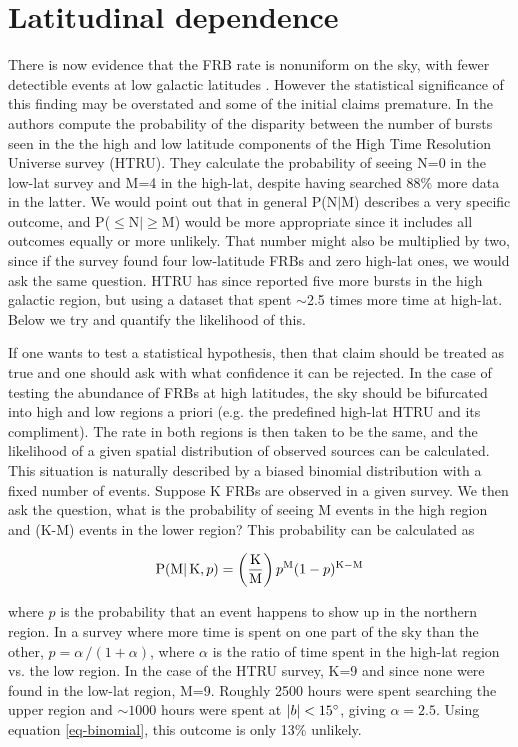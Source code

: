 \documentclass[useAMS,usenatbib]{mn2e}
\begin{document}
\section{Latitudinal dependence}
\label{latitude}
There is now evidence that the FRB rate is nonuniform on the sky, 
with fewer detectible events at low galactic latitudes \citep{2014ira..book.....B}.
However the statistical significance of this finding may be 
overstated and some of the initial claims premature. In \cite{2014ApJ...789L..26P}
the authors compute the probability of the disparity between the number of 
bursts seen in the the high and low latitude components of the High Time Resolution Universe survey 
(HTRU). They calculate the probability of seeing N=0 in the low-lat survey and M=4 in 
the high-lat, despite having searched 88$\%$ more data in the latter. We would point out 
that in general P(N$|$M) describes a very specific outcome, and P($\le$N$|\ge$M) would be 
more appropriate since it includes all outcomes equally or more unlikely.
That number might also be multiplied by two, since if the survey found 
four low-latitude FRBs and zero high-lat ones, we would ask the same question. HTRU 
has since reported five more bursts in the high galactic region, but using a dataset 
that spent $\sim$2.5 times more time at high-lat. Below we try and quantify the likelihood of 
this.

If one wants to 
test a statistical hypothesis, then that claim should be treated as true and one should
ask with what confidence it can be rejected. 
In the case of testing the abundance of FRBs at high latitudes,
the sky should be bifurcated into high and low regions a priori 
(e.g. the predefined high-lat HTRU and its compliment). The rate in both regions 
is then taken to be the same, and the likelihood of a given spatial distribution of observed
sources can be calculated.
This situation is naturally
described by a biased binomial distribution with a fixed number of events. Suppose
K FRBs are observed in a given survey. We then ask the question, what is the probability of 
seeing M events in the high region and (K-M) events in the lower region? 
This probability can be calculated %
as 

\begin{equation}
\label{eq-binomial}
\textup{P(M} | \,\textup{K}, p) = \left ( \frac{\textup{K}}{\textup{M}} \right ) p^{\textup{M}} (1-p)^{\textup{K}-\textup{M}} 
\end{equation}

\noindent where $p$ is the probability that an event happens to show up in the 
northern region. In a survey where more time is spent on one part of the 
sky than the other, $p=\alpha \, /(1 + \alpha)$, where $\alpha$ is the ratio of 
time spent in the high-lat region vs. the low region. In the case of the HTRU 
survey, K=9 and since none were found 
in the low-lat region, M=9. Roughly 2500 hours were spent searching the upper region
and $\sim1000$ hours were spent at $|b| < 15\degree$, giving $\alpha=2.5$. Using equation 
\ref{eq-binomial}, this outcome is only 13$\%$ unlikely. 
\end{document}
